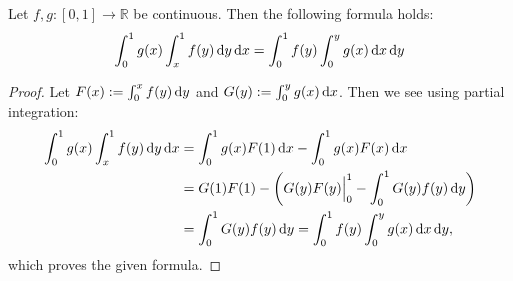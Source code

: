 \begin{Lemma}
    \label{lem:triangle-integration}
    Let $f,g\colon[0,1]\to\mathbb{R}$ be continuous. Then the following formula
    holds:
    \begin{align*}
        \Integ[1]{0}{x}{g(x)\Integ[1]{x}{y}{f(y)}} =
        \Integ[1]{0}{y}{f(y)\Integ[y]{0}{x}{g(x)}}
    \end{align*}
    \begin{proof}
        Let $F(x) := \Integ[x]{0}{y}{f(y)}$ and $G(y) := \Integ[y]{0}{x}{g(x)}$.
        Then we see using partial integration:
        \begin{align*}
            \Integ[1]{0}{x}{g(x)\Integ[1]{x}{y}{f(y)}} &=
            \Integ[1]{0}{x}{g(x)F(1)} - \Integ[1]{0}{x}{g(x)F(x)} \\
            &= G(1)F(1) - \left(\Bigl.G(y)F(y)\Bigr|_0^1 -
            \Integ[1]{0}{y}{G(y)f(y)}\right) \\
            &= \Integ[1]{0}{y}{G(y)f(y)} =
            \Integ[1]{0}{y}{f(y)\Integ[y]{0}{x}{g(x)}},
        \end{align*}
        which proves the given formula.
    \end{proof}
\end{Lemma}
